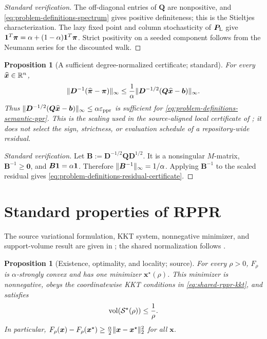 \documentclass[11pt]{article}
\newtheorem{proposition}[theorem]{Proposition}
\theoremstyle{definition}
\theoremstyle{remark}
\theoremstyle{plain}
\begin{document}
\begin{proof}[Standard verification]
The off-diagonal entries of $\bm{Q}$ are nonpositive, and
\cref{eq:problem-definitions-spectrum} gives positive definiteness; this is
the Stieltjes characterization.  The lazy fixed point and column
stochasticity of $\bm{P}_{\rm L}$ give
$\mathbf{1}^T\bm{\pi}=\alpha+(1-\alpha)\mathbf{1}^T\bm{\pi}$. Strict positivity on a seeded
component follows from the Neumann series for the discounted walk.
\end{proof}

\begin{proposition}[A sufficient degree-normalized certificate; standard]
\label{prop:problem-definitions-residual-certificate}
For every $\widehat{\bm{x}}\in\mathbb{R}^n$,
\begin{equation}
    \lVert\bm{D}^{-1}
      (\widehat{\bm{\pi}}-\bm{\pi})\rVert_\infty
    \leq
    \frac{1}{\alpha}
    \lVert\bm{D}^{-1/2}
      (\bm{Q}\widehat{\bm{x}}-\bm{b})\rVert_\infty.
    \label{eq:problem-definitions-residual-certificate}
\end{equation}
Thus
$\lVert\bm{D}^{-1/2}
  (\bm{Q}\widehat{\bm{x}}-\bm{b})\rVert_\infty\leq\alpha\varepsilon_{\mathrm{ppr}}$
is sufficient for \cref{eq:problem-definitions-semantic-ppr}.  This is the
scaling used in the source-aligned local certificate of
\citet{zhou2024iterative}; it does not select the sign, strictness, or
evaluation schedule of a repository-wide residual.
\end{proposition}

\begin{proof}[Standard verification]
Let $\bm{B}:=\bm{D}^{-1/2}\bm{Q}\bm{D}^{1/2}$. It is a nonsingular
$M$-matrix, $\bm{B}^{-1}\geq\bm{0}$, and
$\bm{B}\mathbf{1}=\alpha\mathbf{1}$. Therefore
$\lVert\bm{B}^{-1}\rVert_\infty=1/\alpha$. Applying $\bm{B}^{-1}$ to the scaled
residual gives \cref{eq:problem-definitions-residual-certificate}.
\end{proof}

\section{Standard properties of RPPR}
\label{sec:problem-definitions-rppr-properties}

The source variational formulation, KKT system, nonnegative minimizer, and
support-volume result are given in \citet[Section~4 and
Theorems~1--2]{fountoulakis2019variational}; the shared normalization follows
\citet[Section~3]{fountoulakis2026complexity}.

\begin{proposition}[Existence, optimality, and locality; source]
\label{prop:problem-definitions-rppr-source}
For every $\rho>0$, $F_\rho$ is $\alpha$-strongly convex and has one minimizer
$\bm{x}^\star(\rho)$. This minimizer is nonnegative, obeys the coordinatewise
KKT conditions in \cref{eq:shared-rppr-kkt}, and satisfies
\begin{equation}
    \operatorname{vol}(\mathcal{S}^\star(\rho))\leq\frac{1}{\rho}.
    \label{eq:problem-definitions-support-volume}
\end{equation}
In particular,
$F_\rho(\bm{x})-F_\rho(\bm{x}^\star)\geq
\frac{\alpha}{2}\lVert\bm{x}-\bm{x}^\star\rVert_2^2$ for all $\bm{x}$.
\end{proposition}
\end{document}
